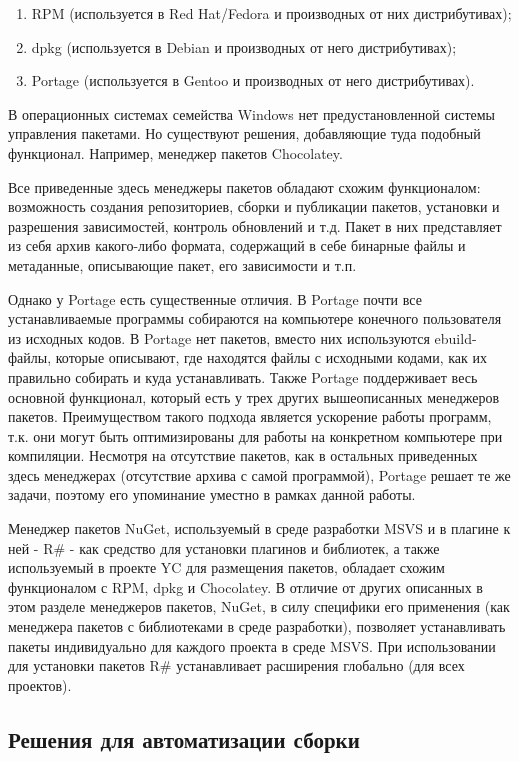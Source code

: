 \documentclass{matmex-diploma-custom}
\begin{document}
\begin{enumerate}
\item
RPM (используется в Red Hat/Fedora и производных от них дистрибутивах);
\item
dpkg (используется в Debian и производных от него дистрибутивах);
\item
Portage (используется в Gentoo и производных от него дистрибутивах).
\end{enumerate}

В операционных системах семейства Windows нет предустановленной системы управления пакетами. Но существуют решения, добавляющие туда подобный функционал. Например, менеджер пакетов Chocolatey.

Все приведенные здесь менеджеры пакетов обладают схожим функционалом: возможность создания репозиториев, сборки и публикации пакетов, установки и разрешения зависимостей, контроль обновлений и т.д. Пакет в них представляет из себя архив какого-либо формата, содержащий в себе бинарные файлы и метаданные, описывающие пакет, его зависимости и т.п.

Однако у Portage есть существенные отличия. В Portage почти все устанавливаемые программы собираются на компьютере конечного пользователя из исходных кодов. В Portage нет пакетов, вместо них используются ebuild-файлы, которые описывают, где находятся файлы с исходными кодами, как их правильно собирать и куда устанавливать. Также Portage поддерживает весь основной функционал, который есть у трех других вышеописанных менеджеров пакетов. Преимуществом такого подхода является ускорение работы программ, т.к. они могут быть оптимизированы для работы на конкретном компьютере при компиляции. Несмотря на отсутствие пакетов, как в остальных приведенных здесь менеджерах (отсутствие архива с самой программой), Portage решает те же задачи, поэтому его упоминание уместно в рамках данной работы.

Менеджер пакетов NuGet, используемый в среде разработки MSVS и в плагине к ней - R\# - как средство для установки плагинов и библиотек, а также используемый в проекте YC для размещения пакетов, обладает схожим функционалом с RPM, dpkg и Chocolatey. В отличие от других описанных в этом разделе менеджеров пакетов, NuGet, в силу специфики его применения (как менеджера пакетов с библиотеками в среде разработки), позволяет устанавливать пакеты индивидуально для каждого проекта в среде MSVS. При использовании для установки пакетов R\# устанавливает расширения глобально (для всех проектов).

\subsection{Решения для автоматизации сборки}
\end{document}
